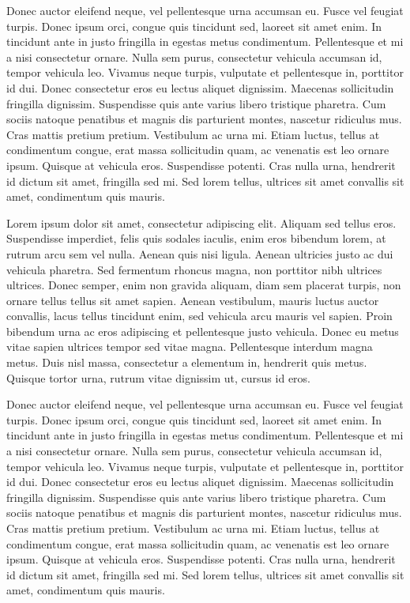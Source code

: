 Donec auctor eleifend neque, vel pellentesque urna accumsan eu. Fusce vel feugiat turpis. Donec ipsum orci, congue quis tincidunt sed, laoreet sit amet enim. In tincidunt ante in justo fringilla in egestas metus condimentum. Pellentesque et mi a nisi consectetur ornare. Nulla sem purus, consectetur vehicula accumsan id, tempor vehicula leo. Vivamus neque turpis, vulputate et pellentesque in, porttitor id dui. Donec consectetur eros eu lectus aliquet dignissim. Maecenas sollicitudin fringilla dignissim. Suspendisse quis ante varius libero tristique pharetra. Cum sociis natoque penatibus et magnis dis parturient montes, nascetur ridiculus mus. Cras mattis pretium pretium. Vestibulum ac urna mi. Etiam luctus, tellus at condimentum congue, erat massa sollicitudin quam, ac venenatis est leo ornare ipsum. Quisque at vehicula eros. Suspendisse potenti. Cras nulla urna, hendrerit id dictum sit amet, fringilla sed mi. Sed lorem tellus, ultrices sit amet convallis sit amet, condimentum quis mauris.

Lorem ipsum dolor sit amet, consectetur adipiscing elit. Aliquam sed tellus eros. Suspendisse imperdiet, felis quis sodales iaculis, enim eros bibendum lorem, at rutrum arcu sem vel nulla. Aenean quis nisi ligula. Aenean ultricies justo ac dui vehicula pharetra. Sed fermentum rhoncus magna, non porttitor nibh ultrices ultrices. Donec semper, enim non gravida aliquam, diam sem placerat turpis, non ornare tellus tellus sit amet sapien. Aenean vestibulum, mauris luctus auctor convallis, lacus tellus tincidunt enim, sed vehicula arcu mauris vel sapien. Proin bibendum urna ac eros adipiscing et pellentesque justo vehicula. Donec eu metus vitae sapien ultrices tempor sed vitae magna. Pellentesque interdum magna metus. Duis nisl massa, consectetur a elementum in, hendrerit quis metus. Quisque tortor urna, rutrum vitae dignissim ut, cursus id eros.

Donec auctor eleifend neque, vel pellentesque urna accumsan eu. Fusce vel feugiat turpis. Donec ipsum orci, congue quis tincidunt sed, laoreet sit amet enim. In tincidunt ante in justo fringilla in egestas metus condimentum. Pellentesque et mi a nisi consectetur ornare. Nulla sem purus, consectetur vehicula accumsan id, tempor vehicula leo. Vivamus neque turpis, vulputate et pellentesque in, porttitor id dui. Donec consectetur eros eu lectus aliquet dignissim. Maecenas sollicitudin fringilla dignissim. Suspendisse quis ante varius libero tristique pharetra. Cum sociis natoque penatibus et magnis dis parturient montes, nascetur ridiculus mus. Cras mattis pretium pretium. Vestibulum ac urna mi. Etiam luctus, tellus at condimentum congue, erat massa sollicitudin quam, ac venenatis est leo ornare ipsum. Quisque at vehicula eros. Suspendisse potenti. Cras nulla urna, hendrerit id dictum sit amet, fringilla sed mi. Sed lorem tellus, ultrices sit amet convallis sit amet, condimentum quis mauris.

